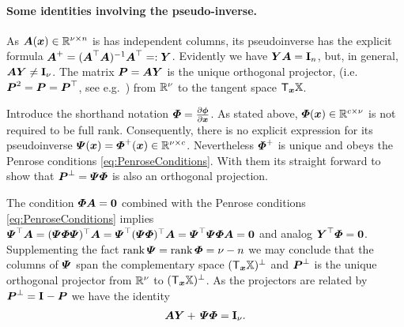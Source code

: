 \paragraph{Some identities involving the pseudo-inverse.}
As $\kinMat(\sysCoord) \in \RealNum^{\numCoord\times\dimConfigSpace}$ is has independent columns, its pseudoinverse has the explicit formula $\kinMat^+ = (\kinMat^\top \kinMat)^{-1} \kinMat^\top =: \kinBasisMat$.
Evidently we have $\kinBasisMat \kinMat = \idMat[\dimConfigSpace]$, but, in general, $\kinMat \kinBasisMat \neq \idMat[\numCoord]$.
The matrix $\mat{P} = \kinMat \kinBasisMat$ is the unique orthogonal projector, (i.e.\ $\mat{P}^2 = \mat{P} = \mat{P}^\top$, see e.g.\ \cite[p.\ 38]{Horn:MatrixAnalysis}) from $\RealNum^\numCoord$ to the tangent space $\Tangent[\sysCoord]\configSpace$.

Introduce the shorthand notation $\geoConstraintMat = \pdiff[\geoConstraint]{\sysCoord}$.
As stated above, $\geoConstraintMat(\sysCoord) \in \RealNum^{\numGeoConst\times\numCoord}$ is not required to be full rank.
Consequently, there is no explicit expression for its pseudoinverse $\InvGeoConstraintMat(\sysCoord) = \geoConstraintMat^+(\sysCoord) \in \RealNum^{\numCoord\times\numGeoConst}$.
Nevertheless $\geoConstraintMat^+$ is unique and obeys the Penrose conditions \eqref{eq:PenroseConditions}.
With them its straight forward to show that $\mat{P}^\bot = \InvGeoConstraintMat \geoConstraintMat$ is also an orthogonal projection.

The condition $\geoConstraintMat\kinMat = \mat{0}$ combined with the Penrose conditions \eqref{eq:PenroseConditions} implies $\InvGeoConstraintMat^\top \kinMat = (\InvGeoConstraintMat \geoConstraintMat \InvGeoConstraintMat)^\top \kinMat = \InvGeoConstraintMat^\top (\InvGeoConstraintMat \geoConstraintMat)^\top \kinMat = \InvGeoConstraintMat^\top \InvGeoConstraintMat \geoConstraintMat \kinMat = \mat{0}$ and analog $\kinBasisMat^\top \geoConstraintMat = \mat{0}$.
Supplementing the fact $\rank\InvGeoConstraintMat = \rank\geoConstraintMat = \numCoord - \dimConfigSpace$ we may conclude that the columns of $\InvGeoConstraintMat$ span the complementary space $(\Tangent[\sysCoord]\configSpace)^\bot$ and $\mat{P}^\bot$ is the unique orthogonal projector from $\RealNum^\numCoord$ to $(\Tangent[\sysCoord]\configSpace)^\bot$.
As the projectors are related by $\mat{P}^\bot = \idMat - \mat{P}$ we have the identity
\begin{align}\label{eq:ProjectionIdentity}
 \kinMat \kinBasisMat +\, \InvGeoConstraintMat \geoConstraintMat = \idMat[\numCoord].
\end{align}

